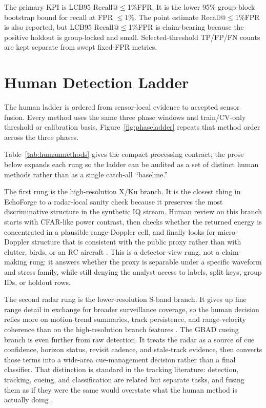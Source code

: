 \documentclass[10pt,journal]{IEEEtran}
\makeatletter
\newcommand{\PrimaryKPI}{LCB95 Recall@$\leq$1\%FPR}
\newcommand{\PointKPI}{Recall@$\leq$1\%FPR}
\makeatother
\begin{document}
The primary KPI is \PrimaryKPI{}. It is the lower 95\% group-block bootstrap bound for recall at FPR $\leq1\%$. The point estimate \PointKPI{} is also reported, but \PrimaryKPI{} is claim-bearing because the positive holdout is group-locked and small. Selected-threshold TP/FP/FN counts are kept separate from swept fixed-FPR metrics.

\section{Human Detection Ladder}
The human ladder is ordered from sensor-local evidence to accepted sensor fusion. Every method uses the same three phase windows and train/CV-only threshold or calibration basis. Figure~\ref{fig:phaseladder} repeats that method order across the three phases.

Table~\ref{tab:humanmethods} gives the compact processing contract; the prose below expands each rung so the ladder can be audited as a set of distinct human methods rather than as a single catch-all ``baseline.''

The first rung is the high-resolution X/Ku branch. It is the closest thing in EchoForge to a radar-local sanity check because it preserves the most discriminative structure in the synthetic IQ stream. Human review on this branch starts with CFAR-like power contrast, then checks whether the returned energy is concentrated in a plausible range-Doppler cell, and finally looks for micro-Doppler structure that is consistent with the public proxy rather than with clutter, birds, or an RC aircraft \cite{skolnik2008,richards2014,rohling1983,chen2011,tahmoush2015,rahman2018,molchanov2014}. This is a detector-view rung, not a claim-making rung: it answers whether the proxy is separable under a specific waveform and stress family, while still denying the analyst access to labels, split keys, group IDs, or holdout rows.

The second radar rung is the lower-resolution S-band branch. It gives up fine range detail in exchange for broader surveillance coverage, so the human decision relies more on motion-trend summaries, track persistence, and range-velocity coherence than on the high-resolution branch features \cite{schleher1999,richards2014,blackman1999,barshalom2001}. The GBAD cueing branch is even further from raw detection. It treats the radar as a source of cue confidence, horizon status, revisit cadence, and stale-track evidence, then converts those terms into a wide-area cue-management decision rather than a final classifier. That distinction is standard in the tracking literature: detection, tracking, cueing, and classification are related but separate tasks, and fusing them as if they were the same would overstate what the human method is actually doing \cite{hall1997,barshalom2001,blackman1999,mahler2007}.
\end{document}
